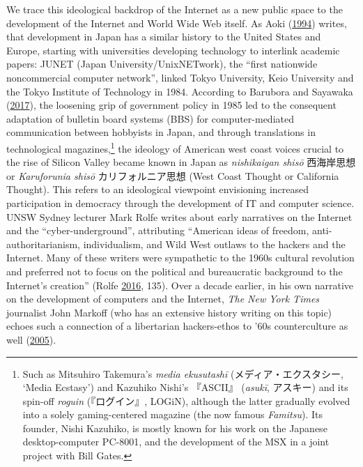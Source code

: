 \documentclass[10pt,british,A4paper,oneside]{memoir}
\begin{document}
We trace this ideological backdrop of the Internet as a new public space
to the development of the Internet and World Wide Web itself. As Aoki
(\protect\hyperlink{ref-aoki_virtual_1994}{1994}) writes, that
development in Japan has a similar history to the United States and
Europe, starting with universities developing technology to interlink
academic papers: JUNET (Japan University/UnixNETwork), the ``first
nationwide noncommercial computer network'', linked Tokyo University,
Keio University and the Tokyo Institute of Technology in 1984. According
to Barubora and Sayawaka
(\protect\hyperlink{ref-barubora_eng:_2017}{2017}), the loosening grip
of government policy in 1985 led to the consequent adaptation of
bulletin board systems (BBS) for computer-mediated communication between
hobbyists in Japan, and through translations in technological
magazines,\footnote{Such as Mitsuhiro Takemura's \emph{media ekusutashī}
  (メディア・エクスタシー, `Media Ecstasy') and Kazuhiko Nishi's
  『ASCII』 (\emph{asukī}, アスキー) and its spin-off \emph{roguin}
  (『ログイン』, LOGiN), although the latter gradually evolved into a
  solely gaming-centered magazine (the now famous \emph{Famitsu}). Its
  founder, Nishi Kazuhiko, is mostly known for his work on the Japanese
  desktop-computer PC-8001, and the development of the MSX in a joint
  project with Bill Gates.} the ideology of American west coast voices
crucial to the rise of Silicon Valley became known in Japan as
\emph{nishikaigan shisō} 西海岸思想 or \emph{Karuforunia shisō}
カリフォルニア思想 (West Coast Thought or California Thought). This
refers to an ideological viewpoint envisioning increased participation
in democracy through the development of IT and computer science. UNSW
Sydney lecturer Mark Rolfe writes about early narratives on the Internet
and the ``cyber-underground'', attributing ``American ideas of freedom,
anti-authoritarianism, individualism, and Wild West outlaws to the
hackers and the Internet. Many of these writers were sympathetic to the
1960s cultural revolution and preferred not to focus on the political
and bureaucratic background to the Internet's creation'' (Rolfe
\protect\hyperlink{ref-rolfe_reinvention_2016}{2016}, 135). Over a decade earlier, in
his own narrative on the development of computers and the Internet,
\emph{The New York Times} journalist John Markoff (who has an extensive
history writing on this topic) echoes such a connection of a libertarian
hackers-ethos to '60s counterculture as well
(\protect\hyperlink{ref-markoff_what_2005}{2005}).
\end{document}
